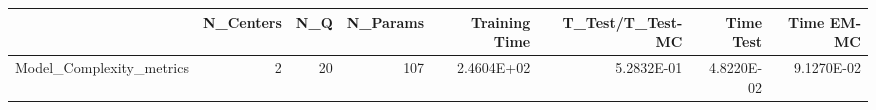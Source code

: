 \begin{tabular}{lrrrrrrr}
\toprule
{} &  N\_Centers &  N\_Q &  N\_Params &  Training Time &  T\_Test/T\_Test-MC &  Time Test &  Time EM-MC \\
\midrule
Model\_Complexity\_metrics &          2 &   20 &       107 &     2.4604E+02 &        5.2832E-01 & 4.8220E-02 &  9.1270E-02 \\
\bottomrule
\end{tabular}

